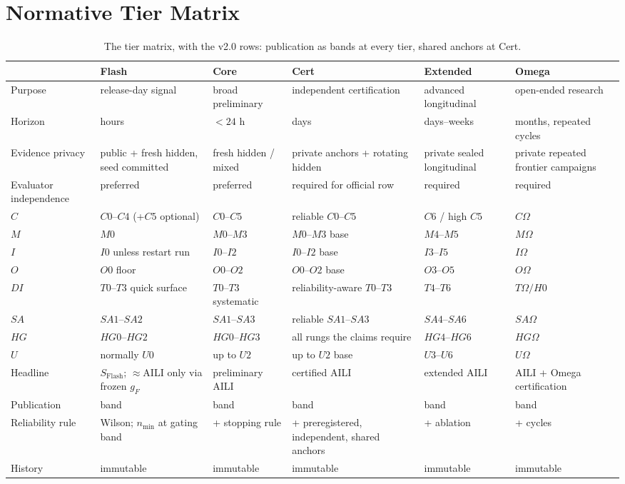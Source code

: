 \documentclass[11pt]{article}
\theoremstyle{definition}
\newcommand{\Om}{\ensuremath{\Omega}}
\begin{document}
\appendix

\section{Normative Tier Matrix}\label{app:matrix}
\begin{table}[H]
\centering\scriptsize
\begin{tabularx}{\textwidth}{@{}l Y Y Y Y Y@{}}
\toprule
 & Flash & Core & Cert & Extended & Omega \\
\midrule
Purpose & release-day signal & broad preliminary & independent certification & advanced longitudinal & open-ended research \\
Horizon & hours & $<24$ h & days & days--weeks & months, repeated cycles \\
Evidence privacy & public + fresh hidden, seed committed & fresh hidden / mixed & private anchors + rotating hidden & private sealed longitudinal & private repeated frontier campaigns \\
Evaluator independence & preferred & preferred & required for official row & required & required \\
$C$ & $C0$--$C4$ (+$C5$ optional) & $C0$--$C5$ & reliable $C0$--$C5$ & $C6$ / high $C5$ & $C\Om$ \\
$M$ & $M0$ & $M0$--$M3$ & $M0$--$M3$ base & $M4$--$M5$ & $M\Om$ \\
$I$ & $I0$ unless restart run & $I0$--$I2$ & $I0$--$I2$ base & $I3$--$I5$ & $I\Om$ \\
$O$ & $O0$ floor & $O0$--$O2$ & $O0$--$O2$ base & $O3$--$O5$ & $O\Om$ \\
$DI$ & $T0$--$T3$ quick surface & $T0$--$T3$ systematic & reliability-aware $T0$--$T3$ & $T4$--$T6$ & $T\Om/H0$ \\
$SA$ & $SA1$--$SA2$ & $SA1$--$SA3$ & reliable $SA1$--$SA3$ & $SA4$--$SA6$ & $SA\Om$ \\
$HG$ & $HG0$--$HG2$ & $HG0$--$HG3$ & all rungs the claims require & $HG4$--$HG6$ & $HG\Om$ \\
$U$ & normally $U0$ & up to $U2$ & up to $U2$ base & $U3$--$U6$ & $U\Om$ \\
Headline & $S_{\mathrm{Flash}}$; $\approx$AILI only via frozen $g_F$ & preliminary AILI & certified AILI & extended AILI & AILI + Omega certification \\
Publication & band & band & band & band & band \\
Reliability rule & Wilson; $n_{\min}$ at gating band & + stopping rule & + preregistered, independent, shared anchors & + ablation & + cycles \\
History & immutable & immutable & immutable & immutable & immutable \\
\bottomrule
\end{tabularx}
\caption{The tier matrix, with the v2.0 rows: publication as bands at every tier, shared anchors at Cert.}
\end{table}
\end{document}

